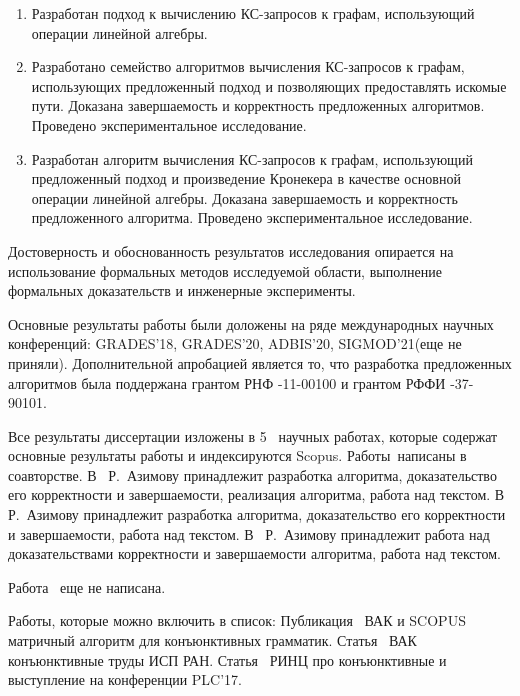 {}
\begin{enumerate}[beginpenalty=10000] %
	\item Разработан подход к вычислению КС-запросов к графам, использующий операции линейной алгебры.
	\item Разработано семейство алгоритмов вычисления КС-запросов к графам, использующих предложенный подход и позволяющих предоставлять искомые пути. Доказана завершаемость и корректность предложенных алгоритмов. Проведено экспериментальное исследование.
	\item Разработан алгоритм вычисления КС-запросов к графам, использующий предложенный подход и произведение Кронекера в качестве основной операции линейной алгебры. Доказана завершаемость и корректность предложенного алгоритма. Проведено экспериментальное исследование.
\end{enumerate}

{\reliability}

Достоверность и обоснованность результатов исследования опирается на использование формальных методов исследуемой области, выполнение формальных доказательств и инженерные эксперименты.

Основные результаты работы были доложены на ряде международных научных конференций: GRADES'18, GRADES'20, ADBIS’20, SIGMOD'21(еще не приняли). Дополнительной апробацией является то, что разработка предложенных алгоритмов была поддержана грантом РНФ -11-00100 и грантом РФФИ -37-90101.


{\publications} Все результаты диссертации изложены в 5~\cite{1,2,3,4,5} научных работах, которые содержат основные результаты работы и индексируются Scopus. Работы~\cite{1,2,3,4}написаны в соавторстве. В~\cite{1} Р.~Азимову принадлежит разработка алгоритма, доказательство его корректности и завершаемости, реализация алгоритма, работа над текстом. В~\cite{2} Р.~Азимову принадлежит разработка алгоритма, доказательство его корректности и завершаемости, работа над текстом. В~\cite{3,4} Р.~Азимову принадлежит работа над доказательствами корректности и завершаемости алгоритма, работа над текстом.
    
Работа~\cite{5} еще не написана.
    
Работы, которые можно включить в список: Публикация~\cite{6} ВАК и SCOPUS матричный алгоритм для конъюнктивных грамматик. Статья~\cite{7} ВАК конъюнктивные труды ИСП РАН. Статья~\cite{8} РИНЦ про конъюнктивные и выступление на конференции PLC'17.

